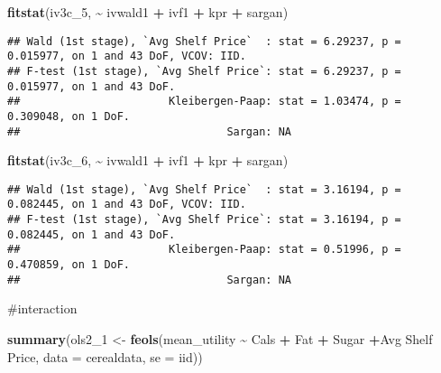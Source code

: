 \documentclass[
]{article}
\newenvironment{Shaded}{\begin{snugshade}}{\end{snugshade}}
\newcommand{\AttributeTok}[1]{\textcolor[rgb]{0.13,0.29,0.53}{#1}}
\newcommand{\FunctionTok}[1]{\textcolor[rgb]{0.13,0.29,0.53}{\textbf{#1}}}
\newcommand{\NormalTok}[1]{#1}
\newcommand{\OtherTok}[1]{\textcolor[rgb]{0.56,0.35,0.01}{#1}}
\newcommand{\SpecialCharTok}[1]{\textcolor[rgb]{0.81,0.36,0.00}{\textbf{#1}}}
\newcommand{\StringTok}[1]{\textcolor[rgb]{0.31,0.60,0.02}{#1}}
\begin{document}
\begin{Shaded}
\begin{Highlighting}[]
\FunctionTok{fitstat}\NormalTok{(iv3c\_5, }\SpecialCharTok{\textasciitilde{}}\NormalTok{ ivwald1 }\SpecialCharTok{+}\NormalTok{ ivf1 }\SpecialCharTok{+}\NormalTok{ kpr }\SpecialCharTok{+}\NormalTok{ sargan)}
\end{Highlighting}
\end{Shaded}

\begin{verbatim}
## Wald (1st stage), `Avg Shelf Price`  : stat = 6.29237, p = 0.015977, on 1 and 43 DoF, VCOV: IID.
## F-test (1st stage), `Avg Shelf Price`: stat = 6.29237, p = 0.015977, on 1 and 43 DoF.
##                       Kleibergen-Paap: stat = 1.03474, p = 0.309048, on 1 DoF.
##                                Sargan: NA
\end{verbatim}

\begin{Shaded}
\begin{Highlighting}[]
\FunctionTok{fitstat}\NormalTok{(iv3c\_6, }\SpecialCharTok{\textasciitilde{}}\NormalTok{ ivwald1 }\SpecialCharTok{+}\NormalTok{ ivf1 }\SpecialCharTok{+}\NormalTok{ kpr }\SpecialCharTok{+}\NormalTok{ sargan)}
\end{Highlighting}
\end{Shaded}

\begin{verbatim}
## Wald (1st stage), `Avg Shelf Price`  : stat = 3.16194, p = 0.082445, on 1 and 43 DoF, VCOV: IID.
## F-test (1st stage), `Avg Shelf Price`: stat = 3.16194, p = 0.082445, on 1 and 43 DoF.
##                       Kleibergen-Paap: stat = 0.51996, p = 0.470859, on 1 DoF.
##                                Sargan: NA
\end{verbatim}

\#interaction

\begin{Shaded}
\begin{Highlighting}[]
\FunctionTok{summary}\NormalTok{(ols2\_1 }\OtherTok{\textless{}{-}} \FunctionTok{feols}\NormalTok{(mean\_utility }\SpecialCharTok{\textasciitilde{}}\NormalTok{ Cals }\SpecialCharTok{+}\NormalTok{ Fat }\SpecialCharTok{+}\NormalTok{ Sugar }\SpecialCharTok{+}\StringTok{\textasciigrave{}}\AttributeTok{Avg Shelf Price}\StringTok{\textasciigrave{}}\NormalTok{, }
                        \AttributeTok{data =}\NormalTok{ cerealdata, }\AttributeTok{se =} \StringTok{\textquotesingle{}iid\textquotesingle{}}\NormalTok{))}
\end{Highlighting}
\end{Shaded}
\end{document}
